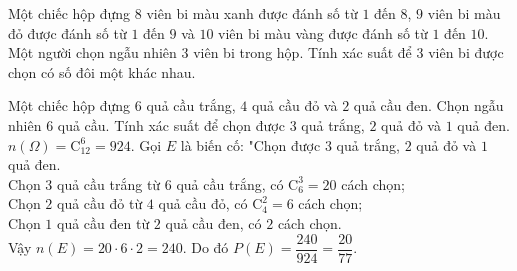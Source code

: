 \begin{bt}%
	Một chiếc hộp đựng $8$ viên bi màu xanh được đánh số từ $1$ đến $8$, $9$ viên bi màu đỏ được đánh số từ $1$ đến $9$ và $10$ viên bi màu vàng được đánh số từ $1$ đến $10$. Một người chọn ngẫu nhiên $3$ viên bi trong hộp. Tính xác suất để $3$ viên bi được chọn có số đôi một khác nhau.
\end{bt}

\begin{bt}%
	Một chiếc hộp đựng $6$ quả cầu trắng, $4$ quả cầu đỏ và $2$ quả cầu đen. Chọn ngẫu nhiên $6$ quả cầu. Tính xác suất để chọn được $3$ quả trắng, $2$ quả đỏ và $1$ quả đen.
	\loigiai
	{
		$n(\Omega)=\mathrm{C}_{12}^{6}=924$. Gọi $E$ là biến cố: "Chọn được $3$ quả trắng, $2$ quả đỏ và $1$ quả đen.\\
		Chọn $3$ quả cầu trắng từ $6$ quả cầu trắng, có $\mathrm{C}_6^3=20$ cách chọn;\\
		Chọn $2$ quả cầu đỏ từ $4$ quả cầu đỏ, có $\mathrm{C}^2_4=6$ cách chọn;\\
		Chọn $1$ quả cầu đen từ $2$ quả cầu đen, có $2$ cách chọn.\\
		Vậy $n(E)=20\cdot6\cdot 2=240$. Do đó $P(E)=\dfrac{240}{924}=\dfrac{20}{77}$.
	}	
\end{bt}


